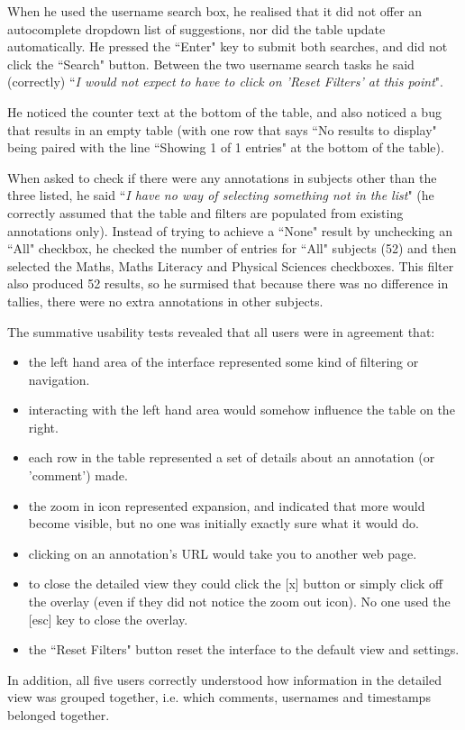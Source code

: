 When he used the username search box, he realised that it did not offer an autocomplete dropdown list of suggestions, nor did the table update automatically. He pressed the ``Enter" key to submit both searches, and did not click the ``Search" button. Between the two username search tasks he said (correctly) ``\textit{I would not expect to have to click on 'Reset Filters' at this point}".

He noticed the counter text at the bottom of the table, and also noticed a bug that results in an empty table (with one row that says ``No results to display" being paired with the line ``Showing 1 of 1 entries" at the bottom of the table). 

When asked to check if there were any annotations in subjects other than the three listed, he said ``\textit{I have no way of selecting something not in the list}" (he correctly assumed that the table and filters are populated from existing annotations only). Instead of trying to achieve a ``None" result by unchecking an ``All" checkbox, he checked the number of entries for ``All" subjects (52) and then selected the Maths, Maths Literacy and Physical Sciences checkboxes. This filter also produced 52 results, so he surmised that because there was no difference in tallies, there were no extra annotations in other subjects.

The summative usability tests revealed that all users were in agreement that:
\begin{itemize}
 \item the left hand area of the interface represented some kind of filtering or navigation.
\item interacting with the left hand area would somehow influence the table on the right.
\item each row in the table represented a set of  details about an annotation (or 'comment') made.
\item the zoom in icon represented expansion, and indicated that more would become visible, but no one was initially exactly sure what it would do.
\item clicking on an annotation's URL would take you to another web page.
\item to close the detailed view they could click the [x] button or simply click off the overlay (even if they did not notice the zoom out icon). No one used the [esc] key to close the overlay. 
\item the ``Reset Filters" button reset the interface to the default view and settings.
\end{itemize}
In addition, all five users correctly understood how information in the detailed view was grouped together, i.e. which comments, usernames and timestamps belonged together. 

